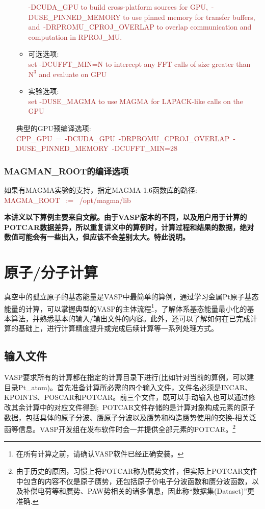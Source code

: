 \begin{itemize}
\begin{itemize}
				\textcolor{brown}{\textrm{-DCUDA\_GPU to build cross-platform sources for GPU,~-DUSE\_PINNED\_MEMORY to use pinned memory for transfer buffers, and~-DRPROMU\_CPROJ\_OVERLAP to overlap communication and computation in RPROJ\_MU.}}
			\item 可选选项:\\
				\textcolor{brown}{\textrm{set -DCUFFT\_MIN=N to intercept any FFT calls of size greater than $\mathrm{N}^3$ and evaluate on GPU}}
			\item 实验选项:\\
				\textcolor{brown}{\textrm{set -DUSE\_MAGMA to use MAGMA for LAPACK-like calls on the GPU}}
		\end{itemize}
		典型的\textrm{GPU}预编译选项:\\
		\textcolor{brown}{\textrm{CPP\_GPU~=~-DCUDA\_GPU~-DRPROMU\_CPROJ\_OVERLAP~-DUSE\_PINNED\_MEMORY~-DCUFFT\_MIN=28}}
\end{itemize}
\subsubsection{\rm{MAGMAN\_ROOT}的编译选项}
如果有\textrm{MAGMA}实验的支持，指定\textrm{MAGMA-1.6}函数库的路径:\\
\textcolor{brown}{\textrm{MAGMA\_ROOT~ :=~ /opt/magma/lib }}


\newpage
\textbf{本讲义以下算例主要来自文献。由于\textrm{VASP}版本的不同，以及用户用于计算的\textrm{POTCAR}数据差异，所以重复讲义中的算例时，计算过程和结果的数据，绝对数值可能会有一些出入，但应该不会差别太大。特此说明。}

\section{原子/分子计算}\label{Sec:atom-Pt}
真空中的孤立原子的基态能量是\textrm{VASP}中最简单的算例，通过学习金属\textrm{Pt}原子基态能量的计算，可以掌握典型的\textrm{VASP}的主体流程\footnote{在所有计算之前，请确认\textrm{VASP}软件已经正确安装。}，了解体系基态能量最小化的基本算法，并熟悉基本的输入/输出文件的内容。此外，还可以了解如何在已完成计算的基础上，进行计算精度提升或完成后续计算等一系列处理方式。
\subsection{输入文件}
\textrm{VASP}要求所有的计算都在指定的计算目录下进行(比如针对当前的算例，可以建目录\textrm{Pt\_atom})。首先准备计算所必需的四个输入文件，文件名必须是\textrm{INCAR}、\textrm{KPOINTS}、\textrm{POSCAR}和\textrm{POTCAR}。前三个文件，既可以手动输入也可以通过修改其余计算中的对应文件得到;~\textrm{POTCAR}文件存储的是计算对象构成元素的原子数据，包括具体的原子分波、赝原子分波以及赝势和构造赝势使用的交换-相关泛函等信息。\textrm{VASP}开发组在发布软件时会一并提供全部元素的\textrm{POTCAR}。\footnote{由于历史的原因，习惯上将\textrm{POTCAR}称为赝势文件，但实际上\textrm{POTCAR}文件中包含的内容不仅是原子赝势，还包括原子价电子分波函数和赝分波函数，以及补偿电荷等和赝势、\textrm{PAW}势相关的诸多信息，因此称“数据集(\textrm{Dataset})”更准确.}
